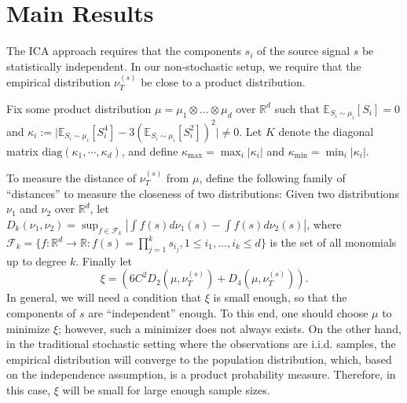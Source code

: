 \documentclass[jmlr]{article}
\newcommand{\todoa}[2][]{ \todo[color=Purple!20,size=\tiny,#1]{#2}} %
\newcommand{\cN}{\cal{N}}
\newcommand{\E}{\mathbb{E}}
\newcommand{\real}{\mathbb{R}}
\newcommand{\R}{\real}
\newcommand{\iid}{i.i.d.\xspace}
\newtheorem{example}[lemma]{Example}
\theoremstyle{definition}
\newtheorem{remark}[lemma]{Remark}
\newcommand{\eps}{\epsilon}
\begin{document}

\section{Main Results}
\label{sec:main}

The ICA approach requires that the components $s_i$ of the source signal $s$ be statistically independent. In our non-stochastic setup, we require that the empirical distribution $\nu_T^{(s)}$ be close to a product distribution.

Fix some product distribution $\mu= \mu_1\otimes \ldots \otimes \mu_d$ over $\R^d$ 
such that $\E_{S_i\sim\mu_i}[S_i]=0$ and $\kappa_i := \vert \E_{S_i\sim \mu_i}[S_i^4] - 3\left(\E_{S_i\sim \mu_i}[S_i^2]\right)^2 \vert \neq 0$. Let
$K$ denote the diagonal matrix $\text{diag}(\kappa_1,\cdots,\kappa_d)$, and define $\kappa_{\max}=\max_{i} |\kappa_i|$ and $\kappa_{\min}=\min_{i} |\kappa_i|$.

To measure the distance of $\nu_T^{(s)}$ from $\mu$, define the following family of ``distances'' to measure the closeness of two distributions: Given two distributions $\nu_1$ and $\nu_2$ over $\R^d$, let $D_k(\nu_1,\nu_2) = \sup_{f\in\mathcal{F}_k} |\int f(s)d\nu_1(s) - \int f(s)d\nu_2(s)|$, where $\mathcal{F}_k=\{f:\R^d \to \R : f(s)=\prod_{j=1}^k s_{i_j}, 1 \le i_1,\ldots,i_k \le d\}$ is the set of all monomials up to degree $k$. Finally let
\begin{equation}
\label{eq:xi}
\xi = \left( 6C^2D_2(\mu, \nu_T^{(s)}) + D_4(\mu, \nu_T^{(s)})\right).
\end{equation}
In general, we will need a condition that $\xi$ is small enough, so that the components of $s$ are ``independent'' enough. To this end, one should choose
$\mu$ to minimize $\xi$; however, such a minimizer does not always exists.
On the other hand, in the traditional stochastic setting where the observations are \iid samples, the empirical distribution will converge to the population distribution, which, based on the independence assumption, is a product probability measure. 
Therefore, in this case, $\xi$ will be small for large enough sample sizes. 
\end{document}
